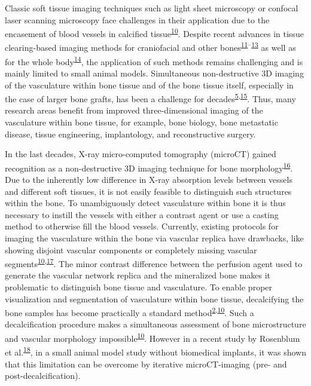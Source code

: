 Classic soft tissue imaging techniques such as light sheet microscopy or confocal laser scanning microscopy face challenges in their application due to the encasement of blood vessels in calcified tissue\textsuperscript{\protect\hyperlink{ref-117R9ULnv}{10}}.
Despite recent advances in tissue clearing-based imaging methods for craniofacial and other bones\textsuperscript{\protect\hyperlink{ref-ZGzobRpX}{11}--\protect\hyperlink{ref-X0aG1K2m}{13}} as well as for the whole body\textsuperscript{\protect\hyperlink{ref-BNZSaEBe}{14}}, the application of such methods remains challenging and is mainly limited to small animal models.
Simultaneous non-destructive 3D imaging of the vasculature within bone tissue and of the bone tissue itself, especially in the case of larger bone grafts, has been a challenge for decades\textsuperscript{\protect\hyperlink{ref-Vu36g0cK}{5},\protect\hyperlink{ref-1FUMXJVtA}{15}}.
Thus, many research areas benefit from improved three-dimensional imaging of the vasculature within bone tissue, for example, bone biology, bone metastatic disease, tissue engineering, implantology, and reconstructive surgery.

In the last decades, X-ray micro-computed tomography (microCT) gained recognition as a non-destructive 3D imaging technique for bone morphology\textsuperscript{\protect\hyperlink{ref-KjvwGWK2}{16}}.
Due to the inherently low difference in X-ray absorption levels between vessels and different soft tissues, it is not easily feasible to distinguish such structures within the bone.
To unambiguously detect vasculature within bone it is thus necessary to instill the vessels with either a contrast agent or use a casting method to otherwise fill the blood vessels.
Currently, existing protocols for imaging the vasculature within the bone via vascular replica have drawbacks, like showing disjoint vascular components or completely missing vascular segments\textsuperscript{\protect\hyperlink{ref-117R9ULnv}{10},\protect\hyperlink{ref-168Ee16HU}{17}}.
The minor contrast difference between the perfusion agent used to generate the vascular network replica and the mineralized bone makes it problematic to distinguish bone tissue and vasculature.
To enable proper visualization and segmentation of vasculature within bone tissue, decalcifying the bone samples has become practically a standard method\textsuperscript{\protect\hyperlink{ref-AHsHFIUt}{2},\protect\hyperlink{ref-117R9ULnv}{10}}.
Such a decalcification procedure makes a simultaneous assessment of bone microstructure and vascular morphology impossible\textsuperscript{\protect\hyperlink{ref-117R9ULnv}{10}}.
However in a recent study by Rosenblum et al.\textsuperscript{\protect\hyperlink{ref-yP3RkDdM}{18}}, in a small animal model study without biomedical implants, it was shown that this limitation can be overcome by iterative microCT-imaging (pre- and post-decalcification).


